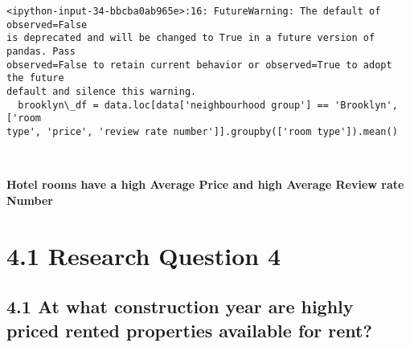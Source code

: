 \documentclass[11pt]{article}
\begin{document}
    \begin{Verbatim}[commandchars=\\\{\}]
<ipython-input-34-bbcba0ab965e>:16: FutureWarning: The default of observed=False
is deprecated and will be changed to True in a future version of pandas. Pass
observed=False to retain current behavior or observed=True to adopt the future
default and silence this warning.
  brooklyn\_df = data.loc[data['neighbourhood group'] == 'Brooklyn', ['room
type', 'price', 'review rate number']].groupby(['room type']).mean()
    \end{Verbatim}

    \begin{center}
    \end{center}
    { \hspace*{\fill} \\}
    
    \textbf{Hotel rooms have a high Average Price and high Average Review
rate Number}

    \hypertarget{research-question-4}{%
\section{4.1 Research Question 4}\label{research-question-4}}

\hypertarget{at-what-construction-year-are-highly-priced-rented-properties-available-for-rent}{%
\subsection{4.1 At what construction year are highly priced rented
properties available for
rent?}\label{at-what-construction-year-are-highly-priced-rented-properties-available-for-rent}}
\end{document}
